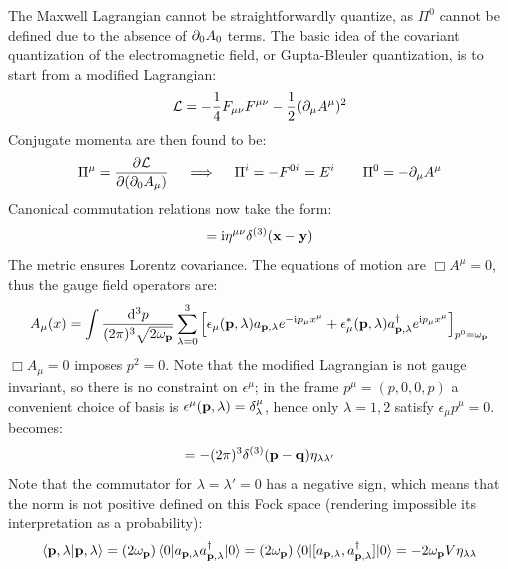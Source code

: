 The Maxwell Lagrangian  cannot be straightforwardly quantize, as $ \Pi^0 $ cannot be defined due to the absence of $ \partial_0 A_0 $ terms. The basic idea of the covariant quantization of the electromagnetic field, or Gupta-Bleuler quantization, is to start from a modified Lagrangian:
\begin{equation}
  \mathcal{L} = - \frac{1}{4} F_{\mu \nu} F^{\mu \nu} - \frac{1}{2} (\partial_\mu A^\mu)^2
\end{equation}
Conjugate momenta are then found to be:
\begin{equation*}
  \Pi^\mu = \frac{\partial \mathcal{L}}{\partial (\partial_0 A_\mu)}
  \quad \implies \quad
  \Pi^i = - F^{0i} = E^i
  \qquad
  \Pi^0 = - \partial_\mu A^\mu
\end{equation*}
Canonical commutation relations now take the form:
\begin{equation}
  [A^\mu(t,\ve{x}) , \Pi^\nu(t,\ve{y})] = \img \eta^{\mu \nu} \delta^{(3)}(\ve{x} - \ve{y})
  \label{eq:qed-canon-comm-rel-1}
\end{equation}
The metric ensures Lorentz covariance. The equations of motion are $ \Box A^\mu = 0 $, thus the gauge field operators are:
\begin{equation}
  A_\mu(x) = \int \frac{\mathrm{d}^3p}{(2\pi)^3 \sqrt{2\omega_{\mathbf{p}}}} \sum_{\lambda = 0}^{3} \left[ \epsilon_\mu(\mathbf{p},\lambda) a_{\mathbf{p},\lambda} e^{-\mathrm{i} p_\mu x^\mu} + \epsilon_\mu^*(\mathbf{p},\lambda) a_{\mathbf{p},\lambda}^\dagger e^{\mathrm{i} p_\mu x^\mu} \right]_{p^0 = \omega_{\mathbf{p}}}
  \label{eq:qed-gauge-fourier}
\end{equation}
$ \Box A_\mu = 0 $ imposes $ p^2 = 0 $. Note that the modified Lagrangian is not gauge invariant, so there is no constraint on $ \epsilon^\mu $; in the frame $ p^\mu = (p,0,0,p) $ a convenient choice of basis is $ \epsilon^\mu(\mathbf{p},\lambda) = \delta^\mu_\lambda $, hence only $ \lambda = 1,2 $ satisfy $ \epsilon_\mu p^\mu = 0 $.  becomes:
\begin{equation}
  [a_{\ve{p},\lambda} , a_{\ve{p},\lambda'}\dg] = - (2\pi)^3 \delta^{(3)}(\ve{p} - \ve{q}) \eta_{\lambda \lambda'}
\end{equation}
Note that the commutator for $ \lambda = \lambda' = 0 $ has a negative sign, which means that the norm is not positive defined on this Fock space (rendering impossible its interpretation as a probability):
\begin{equation}
  \braket{\mathbf{p} , \lambda | \mathbf{p} , \lambda} = (2\omega_{\mathbf{p}}) \braket{0 | a_{\mathbf{p},\lambda} a_{\mathbf{p},\lambda}^\dagger | 0} = (2\omega_{\mathbf{p}}) \braket{0 | [a_{\mathbf{p},\lambda} , a_{\mathbf{p},\lambda}^\dagger] | 0} = - 2\omega_{\mathbf{p}} V \eta_{\lambda \lambda}
\end{equation}

